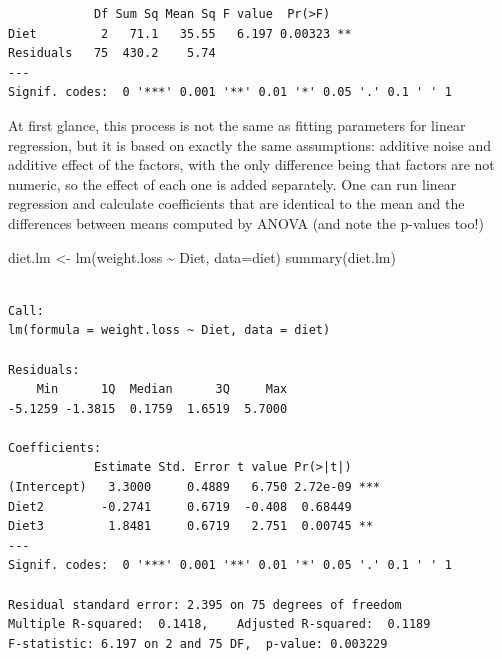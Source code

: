 \documentclass[
  letterpaper,
  DIV=11,
  numbers=noendperiod]{scrreprt}
\newenvironment{Shaded}{\begin{snugshade}}{\end{snugshade}}
\newcommand{\AttributeTok}[1]{\textcolor[rgb]{0.40,0.45,0.13}{#1}}
\newcommand{\FunctionTok}[1]{\textcolor[rgb]{0.28,0.35,0.67}{#1}}
\newcommand{\NormalTok}[1]{\textcolor[rgb]{0.00,0.23,0.31}{#1}}
\newcommand{\OtherTok}[1]{\textcolor[rgb]{0.00,0.23,0.31}{#1}}
\newcommand{\SpecialCharTok}[1]{\textcolor[rgb]{0.37,0.37,0.37}{#1}}
\begin{document}
\begin{verbatim}
            Df Sum Sq Mean Sq F value  Pr(>F)   
Diet         2   71.1   35.55   6.197 0.00323 **
Residuals   75  430.2    5.74                   
---
Signif. codes:  0 '***' 0.001 '**' 0.01 '*' 0.05 '.' 0.1 ' ' 1
\end{verbatim}

At first glance, this process is not the same as fitting parameters for
linear regression, but it is based on exactly the same assumptions:
additive noise and additive effect of the factors, with the only
difference being that factors are not numeric, so the effect of each one
is added separately. One can run linear regression and calculate
coefficients that are identical to the mean and the differences between
means computed by ANOVA (and note the p-values too!)

\begin{Shaded}
\begin{Highlighting}[]
\NormalTok{diet.lm }\OtherTok{\textless{}{-}} \FunctionTok{lm}\NormalTok{(weight.loss }\SpecialCharTok{\textasciitilde{}}\NormalTok{ Diet, }\AttributeTok{data=}\NormalTok{diet)}
\FunctionTok{summary}\NormalTok{(diet.lm)}
\end{Highlighting}
\end{Shaded}

\begin{verbatim}

Call:
lm(formula = weight.loss ~ Diet, data = diet)

Residuals:
    Min      1Q  Median      3Q     Max 
-5.1259 -1.3815  0.1759  1.6519  5.7000 

Coefficients:
            Estimate Std. Error t value Pr(>|t|)    
(Intercept)   3.3000     0.4889   6.750 2.72e-09 ***
Diet2        -0.2741     0.6719  -0.408  0.68449    
Diet3         1.8481     0.6719   2.751  0.00745 ** 
---
Signif. codes:  0 '***' 0.001 '**' 0.01 '*' 0.05 '.' 0.1 ' ' 1

Residual standard error: 2.395 on 75 degrees of freedom
Multiple R-squared:  0.1418,    Adjusted R-squared:  0.1189 
F-statistic: 6.197 on 2 and 75 DF,  p-value: 0.003229
\end{verbatim}

\begin{Shaded}
\end{Shaded}
\end{document}
